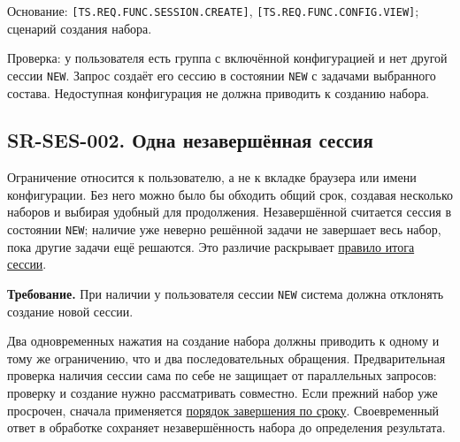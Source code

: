 \documentclass[12pt,a4paper]{article}
\begin{document}
Основание: \texttt{[TS.\allowbreak{}REQ.\allowbreak{}FUNC.\allowbreak{}SESSION.\allowbreak{}CREATE]}, \texttt{[TS.\allowbreak{}REQ.\allowbreak{}FUNC.\allowbreak{}CONFIG.\allowbreak{}VIEW]}; сценарий создания набора.

Проверка: у пользователя есть группа с включённой конфигурацией и нет другой сессии \texttt{NEW}. Запрос создаёт его сессию в состоянии \texttt{NEW} с задачами выбранного состава. Недоступная конфигурация не должна приводить к созданию набора.

\subsection{SR-SES-002. Одна незавершённая сессия}\label{sr-ses-002-ux43eux434ux43dux430-ux43dux435ux437ux430ux432ux435ux440ux448ux451ux43dux43dux430ux44f-ux441ux435ux441ux441ux438ux44f}

\hypertarget{sr-ses-002-одна-незавершённая-сессия}{}

Ограничение относится к пользователю, а не к вкладке браузера или имени конфигурации. Без него можно было бы обходить общий срок, создавая несколько наборов и выбирая удобный для продолжения. Незавершённой считается сессия в состоянии \texttt{NEW}; наличие уже неверно решённой задачи не завершает весь набор, пока другие задачи ещё решаются. Это различие раскрывает \hyperref[sr-ses-007-ux438ux442ux43eux433-ux441ux435ux441ux441ux438ux438]{правило итога сессии}.

\textbf{Требование.} При наличии у пользователя сессии \texttt{NEW} система должна отклонять создание новой сессии.

Два одновременных нажатия на создание набора должны приводить к одному и тому же ограничению, что и два последовательных обращения. Предварительная проверка наличия сессии сама по себе не защищает от параллельных запросов: проверку и создание нужно рассматривать совместно. Если прежний набор уже просрочен, сначала применяется \href{../07_\%D0\%9F\%D1\%80\%D0\%BE\%D0\%B3\%D1\%80\%D0\%B0\%D0\%BC\%D0\%BC\%D0\%BD\%D1\%8B\%D0\%B5_\%D1\%82\%D1\%80\%D0\%B5\%D0\%B1\%D0\%BE\%D0\%B2\%D0\%B0\%D0\%BD\%D0\%B8\%D1\%8F/DOC-06.2_\%D0\%A1\%D0\%B5\%D1\%81\%D1\%81\%D0\%B8\%D0\%B8_\%D0\%B7\%D0\%B0\%D0\%B4\%D0\%B0\%D1\%87_\%D0\%B8_\%D0\%BF\%D0\%BB\%D0\%B0\%D0\%BD\%D0\%B8\%D1\%80\%D0\%BE\%D0\%B2\%D1\%89\%D0\%B8\%D0\%BA.pdf\#nameddest=4-\%D0\%BA\%D0\%BE\%D0\%BD\%D1\%82\%D1\%80\%D0\%BE\%D0\%BB\%D1\%8C-\%D1\%81\%D1\%80\%D0\%BE\%D0\%BA\%D0\%B0-\%D0\%B8-\%D0\%B8\%D1\%82\%D0\%BE\%D0\%B3}{порядок завершения по сроку}. Своевременный ответ в обработке сохраняет незавершённость набора до определения результата.
\end{document}
